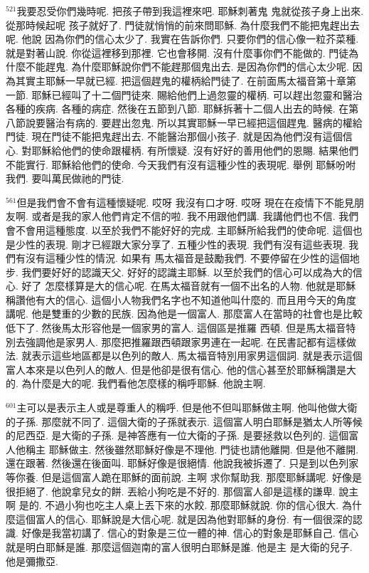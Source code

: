 \documentclass{book}
\begin{document}
$^{521}$我要忍受你們幾時呢.
把孩子帶到我這裡來吧.
耶穌刺著鬼 鬼就從孩子身上出來.
從那時候起呢 孩子就好了.
門徒就悄悄的前來問耶穌.
為什麼我們不能把鬼趕出去呢.
他說 因為你們的信心太少了.
我實在告訴你們.
只要你們的信心像一粒芥菜種.
就是對著山說.
你從這裡移到那裡.
它也會移開.
沒有什麼事你們不能做的.
門徒為什麼不能趕鬼.
為什麼耶穌說你們不能趕那個鬼出去.
是因為你們的信心太少呢.
因為其實主耶穌一早就已經.
把這個趕鬼的權柄給門徒了.
在前面馬太福音第十章第一節.
耶穌已經叫了十二個門徒來.
賜給他們上過忽靈的權柄.
可以趕出忽靈和醫治各種的疾病.
各種的病症.
然後在五節到八節.
耶穌拆著十二個人出去的時候.
在第八節說要醫治有病的.
要趕出忽鬼.
所以其實耶穌一早已經把這個趕鬼.
醫病的權給門徒.
現在門徒不能把鬼趕出去.
不能醫治那個小孩子.
就是因為他們沒有這個信心.
對耶穌給他們的使命跟權柄.
有所懷疑.
沒有好好的善用他們的恩賜.
結果他們不能實行.
耶穌給他們的使命.
今天我們有沒有這種少性的表現呢.
舉例 耶穌吩咐我們.
要叫萬民做祂的門徒.

$^{561}$但是我們會不會有這種懷疑呢.
哎呀 我沒有口才呀.
哎呀 現在在疫情下不能見朋友啊.
或者是我的家人他們肯定不信的啦.
我不用跟他們講.
我講他們也不信.
我們會不會用這種態度.
以至於我們不能好好的完成.
主耶穌所給我們的使命呢.
這個也是少性的表現.
剛才已經跟大家分享了.
五種少性的表現.
我們有沒有這些表現.
我們有沒有這種少性的情況.
如果有 馬太福音是鼓勵我們.
不要停留在少性的這個地步.
我們要好好的認識天父.
好好的認識主耶穌.
以至於我們的信心可以成為大的信心.
好了 怎麼樣算是大的信心呢.
在馬太福音就有一個不出名的人物.
他就是耶穌稱讚他有大的信心.
這個小人物我們名字也不知道他叫什麼的.
而且用今天的角度講呢.
他是雙重的少數的民族.
因為他是一個富人.
那麼富人在當時的社會也是比較低下了.
然後馬太形容他是一個家男的富人.
這個區是推羅 西頓.
但是馬太福音特別去強調他是家男人.
那麼把推羅跟西頓跟家男連在一起呢.
在民書記都有這樣做法.
就表示這些地區都是以色列的敵人.
馬太福音特別用家男這個詞.
就是表示這個富人本來是以色列人的敵人.
但是他卻是很有信心.
他的信心甚至於耶穌稱讚是大的.
為什麼是大的呢.
我們看他怎麼樣的稱呼耶穌.
他說主啊.

$^{601}$主可以是表示主人或是尊重人的稱呼.
但是他不但叫耶穌做主啊.
他叫他做大衛的子孫.
那麼就不同了.
這個大衛的子孫就表示.
這個富人明白耶穌是猶太人所等候的尼西亞.
是大衛的子孫.
是神答應有一位大衛的子孫.
是要拯救以色列的.
這個富人他稱主 耶穌做主.
然後雖然耶穌好像是不理他.
門徒也請他離開.
但是他不離開.
還在跟著.
然後還在後面叫.
耶穌好像是很絕情.
他說我被拆遷了.
只是到以色列家等你養.
但是這個富人跪在耶穌的面前說.
主啊 求你幫助我.
那麼耶穌講呢.
好像是很拒絕了.
他說拿兒女的餅.
丟給小狗吃是不好的.
那個富人卻是這樣的謙卑.
說主啊 是的.
不過小狗也吃主人桌上丟下來的水餃.
那麼耶穌就說.
你的信心很大.
為什麼這個富人的信心.
耶穌說是大信心呢.
就是因為他對耶穌的身份.
有一個很深的認識.
好像是我當初講了.
信心的對象是三位一體的神.
信心的對象是耶穌自己.
信心就是明白耶穌是誰.
那麼這個迦南的富人很明白耶穌是誰.
他是主 是大衛的兒子.
他是彌撒亞.
\end{document}
